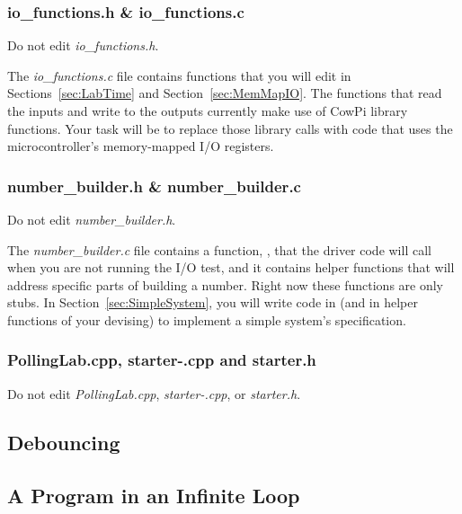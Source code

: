 \subsubsection{io\_functions.h \& io\_functions.c}

Do not edit \textit{io\_functions.h}.

The \textit{io\_functions.c} file contains functions that you will edit in Sections~\ref{sec:LabTime} and Section~\ref{sec:MemMapIO}.
The functions that read the inputs and write to the outputs currently make use of CowPi library functions.
Your task will be to replace those library calls with code that uses the microcontroller's memory-mapped I/O registers.


\subsubsection{number\_builder.h \& number\_builder.c}

Do not edit \textit{number\_builder.h}.

The \textit{number\_builder.c} file contains a function, , that the driver code will call when you are not running the I/O test,
and it contains helper functions that will address specific parts of building a number.
Right now these functions are only stubs.
In Section~\ref{sec:SimpleSystem}, you will write code in  (and in helper functions of your devising) to implement a simple system's specification.

\subsubsection{PollingLab.cpp, starter-\lowercaseprocessor.cpp and starter.h}

Do not edit \textit{PollingLab.cpp}, \textit{starter-\lowercaseprocessor.cpp}, or \textit{starter.h}.


\subsection{Debouncing} \label{subsec:debouncing}



\subsection{A Program in an Infinite Loop} \label{subsec:infiniteLoop}

